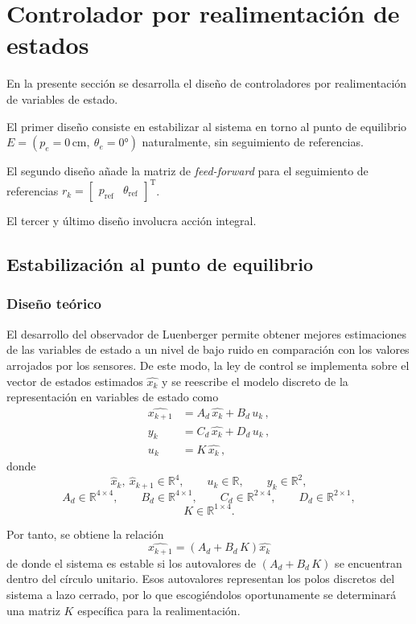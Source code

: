 \section{Controlador por realimentación de estados}

En la presente sección se desarrolla el diseño de controladores por realimentación de variables de estado.

El primer diseño consiste en estabilizar al sistema en torno al punto de equilibrio $ E = \left( p_e = 0\,\text{cm}, ~ \theta_e = 0\text{°} \right)$ naturalmente, sin seguimiento de referencias.

El segundo diseño añade la matriz de \textit{feed-forward} para el seguimiento de referencias $
r_k =
\begin{bmatrix}
p_\text{ref} & \theta_\text{ref}
\end{bmatrix}^\text{T}
$.

El tercer y último diseño involucra acción integral.

\subsection{Estabilización al punto de equilibrio}
\subsubsection{Diseño teórico}

El desarrollo del observador de Luenberger permite obtener mejores estimaciones de las variables de estado a un nivel de bajo ruido en comparación con los valores arrojados por los sensores. De este modo, la ley de control se implementa sobre el vector de estados estimados $\widehat{x_k}$ y se reescribe el modelo discreto de la representación en variables de estado como
\begin{align*}
\widehat{x_{k+1}} &= A_d \, \widehat{x_k} + B_d \, u_k\,, \\
y_k &= C_d \, \widehat{x_k} + D_d \, u_k \, , \\
u_k &= K \, \widehat{x_k} \, ,
\end{align*}
donde
\[
\widehat{x}_k,\ \widehat{x}_{k+1} \in \mathbb{R}^4,\qquad
u_k \in \mathbb{R},\qquad
y_k \in \mathbb{R}^2,
\]
\[
A_d \in \mathbb{R}^{4\times4},\qquad
B_d \in \mathbb{R}^{4\times1},\qquad
C_d \in \mathbb{R}^{2\times4},\qquad
D_d \in \mathbb{R}^{2\times1},
\]
\[
K \in \mathbb{R}^{1\times4}.
\]

Por tanto, se obtiene la relación
\[
\widehat{x_{k+1}} = \left( A_d + B_d \, K \right) \widehat{x_k}
\]
de donde el sistema es estable si los autovalores de $\left( A_d + B_d \, K \right)$ se encuentran dentro del círculo unitario. Esos autovalores representan los polos discretos del sistema a lazo cerrado, por lo que escogiéndolos oportunamente se determinará una matriz $K$ específica para la realimentación.

